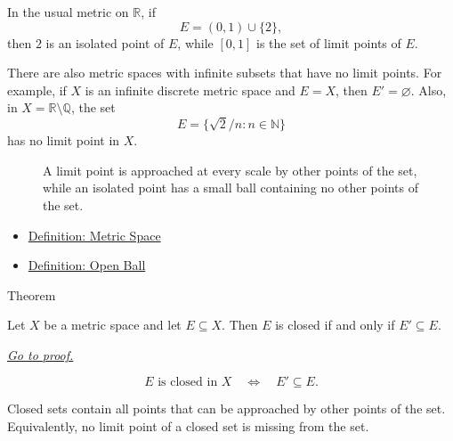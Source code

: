 \begin{remark*}[Examples]
In the usual metric on \(\mathbb{R}\), if
\[
  E=(0,1)\cup\{2\},
\]
then \(2\) is an isolated point of \(E\), while \([0,1]\) is the set of limit
points of \(E\).

There are also metric spaces with infinite subsets that have no limit points.
For example, if \(X\) is an infinite discrete metric space and \(E=X\), then
\(E'=\varnothing\).  Also, in \(X=\mathbb{R}\setminus\mathbb{Q}\), the set
\[
  E=\{\sqrt{2}/n:n\in\mathbb{N}\}
\]
has no limit point in \(X\).
\end{remark*}

\begin{figure}[htbp]
\centering

\caption{A limit point is approached at every scale by other points of the
set, while an isolated point has a small ball containing no other points of
the set.}
\label{fig:limit-isolated-points}
\end{figure}

\begin{dependencies}
\begin{itemize}
  \item \hyperref[def:metric-space]{Definition: Metric Space}
  \item \hyperref[def:metric-open-ball]{Definition: Open Ball}
\end{itemize}
\end{dependencies}

\begin{theorembox}{Theorem}
\begin{theorem}
\label{thm:metric-closed-sets-contain-limit-points}
Let \(X\) be a metric space and let \(E\subseteq X\).  Then \(E\) is closed if
and only if \(E'\subseteq E\).

\smallskip
\noindent
\hyperref[prf:metric-closed-sets-contain-limit-points]{\textit{Go to proof.}}
\end{theorem}
\end{theorembox}

\begin{remark*}
\[
E\text{ is closed in }X
\quad\Longleftrightarrow\quad
E'\subseteq E.
\]
\end{remark*}

\begin{remark*}[Interpretation]
Closed sets contain all points that can be approached by other points of the
set.  Equivalently, no limit point of a closed set is missing from the set.
\end{remark*}

